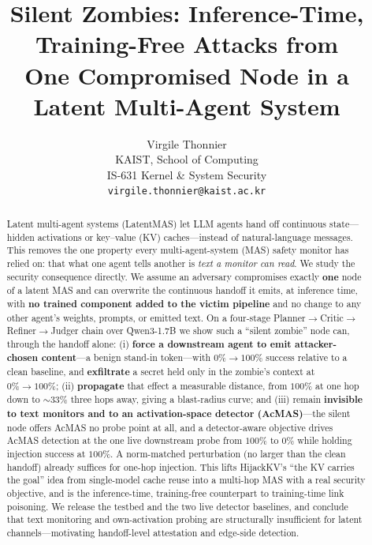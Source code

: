 \documentclass{article}
\title{Silent Zombies: Inference-Time, Training-Free Attacks from\\ One Compromised Node in a Latent Multi-Agent System}
\author{%
  Virgile Thonnier\\
  KAIST, School of Computing\\
  IS-631 Kernel \& System Security\\
  \texttt{virgile.thonnier@kaist.ac.kr}\\
}
\begin{document}
\maketitle

\begin{abstract}
Latent multi-agent systems (LatentMAS) let LLM agents hand off continuous state---hidden activations or key--value (KV) caches---instead of natural-language messages. This removes the one property every multi-agent-system (MAS) safety monitor has relied on: that what one agent tells another is \emph{text a monitor can read}. We study the security consequence directly. We assume an adversary compromises exactly \textbf{one} node of a latent MAS and can overwrite the continuous handoff it emits, at inference time, with \textbf{no trained component added to the victim pipeline} and no change to any other agent's weights, prompts, or emitted text. On a four-stage Planner$\to$Critic$\to$Refiner$\to$Judger chain over Qwen3-1.7B we show such a ``silent zombie'' node can, through the handoff alone: (i) \textbf{force a downstream agent to emit attacker-chosen content}---a benign stand-in token---with $0\%\!\to\!100\%$ success relative to a clean baseline, and \textbf{exfiltrate} a secret held only in the zombie's context at $0\%\!\to\!100\%$; (ii) \textbf{propagate} that effect a measurable distance, from $100\%$ at one hop down to $\sim\!33\%$ three hops away, giving a blast-radius curve; and (iii) remain \textbf{invisible to text monitors and to an activation-space detector (AcMAS)}---the silent node offers AcMAS no probe point at all, and a detector-aware objective drives AcMAS detection at the one live downstream probe from $100\%$ to $0\%$ while holding injection success at $100\%$. A norm-matched perturbation (no larger than the clean handoff) already suffices for one-hop injection. This lifts HijackKV's ``the KV carries the goal'' idea from single-model cache reuse into a multi-hop MAS with a real security objective, and is the inference-time, training-free counterpart to training-time link poisoning. We release the testbed and the two live detector baselines, and conclude that text monitoring and own-activation probing are structurally insufficient for latent channels---motivating handoff-level attestation and edge-side detection.
\end{abstract}

\end{document}
